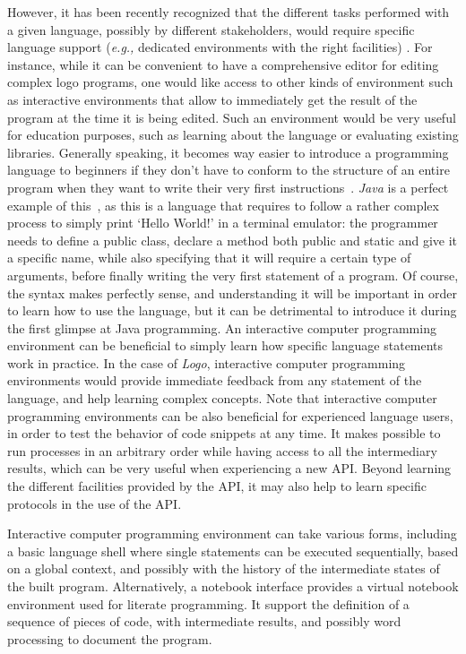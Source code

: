 However, it has been recently recognized that the different tasks performed with a given language, possibly by different stakeholders, would require specific language support (\emph{e.g.,} dedicated environments with the right facilities) \cite{acher:hal-01061576}. For instance, while it can be convenient to have a comprehensive editor for editing complex logo programs, one would like access to other kinds of environment such as interactive environments that allow to immediately get the result of the program at the time it is being edited. Such an environment would be very useful for education purposes, such as learning about the language or evaluating existing libraries. Generally speaking, it becomes way easier to introduce a programming language to beginners if they don't have to conform to the structure of an entire program when they want to write their very first instructions~\cite{10.1007/BFb0033856}. \emph{Java} is a perfect example of this~\cite{Gray:2003:PGI:949344.949394,Allen:2002:DLP:563340.563395}, as this is a language that requires to follow a rather complex process to simply print `Hello World!' in a terminal emulator: the programmer needs to define a public class, declare a method both public and static and give it a specific name, while also specifying that it will require a certain type of arguments, before finally writing the very first statement of a program. Of course, the syntax makes perfectly sense, and understanding it will be important in order to learn how to use the language, but it can be detrimental to introduce it during the first glimpse at Java programming. An interactive computer programming environment can be beneficial to simply learn how specific language statements work in practice. In the case of \textit{Logo}, interactive computer programming environments would provide immediate feedback from any statement of the language, and help learning complex concepts. Note that interactive computer programming environments can be also beneficial for experienced language users, in order to test the behavior of code snippets at any time. It makes possible to run processes in an arbitrary order while having access to all the intermediary results, which can be very useful when experiencing a new API. Beyond learning the different facilities provided by the API, it may also help to learn specific protocols in the use of the API. 

Interactive computer programming environment can take various forms, including a basic language shell where single statements can be executed sequentially, based on a global context, and possibly with the history of the intermediate states of the built program. Alternatively, a notebook interface provides a virtual notebook environment used for literate programming. It support the definition of a sequence of pieces of code, with intermediate results, and possibly word processing to document the program. 

